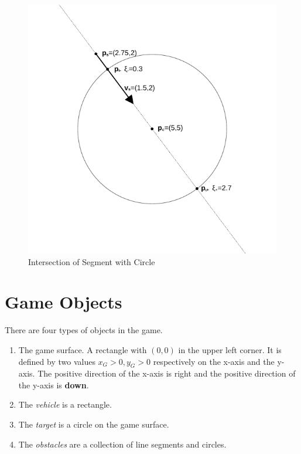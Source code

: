 \documentclass[11pt]{article}
\begin{document}
\begin{figure}
    \centering
    \includegraphics{odg/circle-segment.pdf}
    \caption{Intersection of Segment with Circle}
    \label{fig-intersection-circle}
\end{figure}

\pagebreak
\section{Game Objects}
\label{sec-game-objects}
There are four types of objects in the game.
\begin{enumerate}
    \item The game surface. A rectangle with $(0,0)$ in the upper left corner.
        It is defined by two values $x_G > 0, y_G>0$ respectively on the x-axis
        and the y-axis. The positive direction of the x-axis is right and the
        positive direction of the y-axis is \textbf{down}.
    \item The {\sl vehicle} is a rectangle.
    \item The {\sl target} is a circle on the game surface.
    \item The {\sl obstacles} are a collection of line segments and circles.
\end{enumerate}
\end{document}
